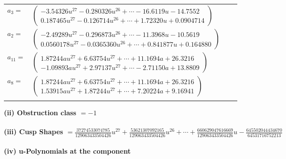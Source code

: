 \documentclass[1p]{elsarticle_modified}
\theoremstyle{definition}
\begin{document}
\begin{tabular}{m{7pt} m{180pt} m{7pt} m{180pt} }
\flushright $a_{3}=$&$\begin{pmatrix}-3.54326 u^{27}-0.280326 u^{26}+\cdots-16.6119 u-14.7552\\0.187465 u^{27}-0.126714 u^{26}+\cdots+1.72320 u+0.0904714\end{pmatrix}$ \\
\flushright $a_{2}=$&$\begin{pmatrix}-2.49289 u^{27}-0.296873 u^{26}+\cdots-11.3968 u-10.5619\\0.0560178 u^{27}-0.0365360 u^{26}+\cdots+0.841877 u+0.164880\end{pmatrix}$ \\
\flushright $a_{11}=$&$\begin{pmatrix}1.87244 a u^{27}+6.63754 u^{27}+\cdots+11.1694 a+26.3216\\-1.09893 a u^{27}+2.97137 u^{27}+\cdots-2.71150 a+13.8809\end{pmatrix}$ \\
\flushright $a_{8}=$&$\begin{pmatrix}1.87244 a u^{27}+6.63754 u^{27}+\cdots+11.1694 a+26.3216\\1.53915 a u^{27}+1.87244 u^{27}+\cdots+7.20224 a+9.16941\end{pmatrix}$\\&\end{tabular}
\flushleft \textbf{(ii) Obstruction class $= -1$}\\~\\
\flushleft \textbf{(iii) Cusp Shapes $= \frac{37274533074785}{129063433504426} u^{27}+\frac{53621307092165}{129063433504426} u^{26}+\cdots+\frac{660629047616669}{129063433504426} u-\frac{645502044434670}{64531716752213}$}\\~\\
\newpage\renewcommand{\arraystretch}{1}
\flushleft \textbf{(iv) u-Polynomials at the component}\newline \\
\end{document}
